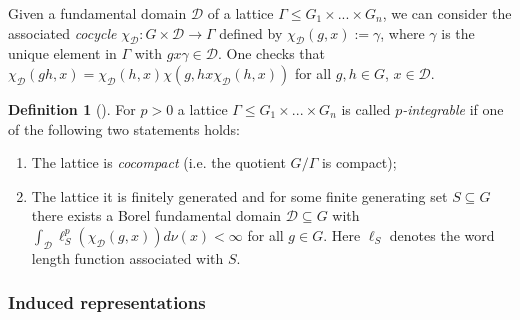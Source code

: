 \documentclass[a4paper,11pt,reqno]{amsart}
\numberwithin{equation}{section}
\theoremstyle{definition}
\newtheorem{definition}[theorem]{Definition}
\theoremstyle{remark}
\theoremstyle{remark}
\begin{document}
Given a fundamental domain $\mathcal{D}$ of a lattice $\Gamma\leq G_{1}\times...\times G_{n}$, we can consider the associated \emph{cocycle} $\chi_{\mathcal{D}}:G\times\mathcal{D}\rightarrow\Gamma$ defined by $\chi_{\mathcal{D}}(g,x):=\gamma$, where $\gamma$ is the unique element in $\Gamma$ with $gx\gamma\in\mathcal{D}$. One checks that $\chi_{\mathcal{D}}(gh,x)=\chi_{\mathcal{D}}(h,x)\chi\left(g,hx\chi_{\mathcal{D}}(h,x)\right)$ for all $g,h\in G$, $x\in\mathcal{D}$.

\begin{definition}[{\cite[Definition 8.2]{BaderFurmanGelanderMonod}}] \label{p-integrableDefinition} For $p>0$ a lattice $\Gamma\leq G_{1}\times...\times G_{n}$ is called \emph{$p$-integrable} if one of the following two statements holds:
\begin{enumerate}
\item The lattice is \emph{cocompact} (i.e. the quotient $G/\Gamma$ is compact);
\item The lattice it is finitely generated and for some finite generating set $S\subseteq G$ there exists a Borel fundamental domain $\mathcal{D}\subseteq G$ with $\int_{\mathcal{D}}\ell_{S}^{p}\left(\chi_{\mathcal{D}}(g,x)\right)d\nu(x)<\infty$ for all $g\in G$. Here $\ell_{S}$ denotes the word length function associated with $S$.
\end{enumerate}
\end{definition}

\vspace{3mm}


\subsubsection{Induced representations\label{subsec:Induced-representations}}
\end{document}
